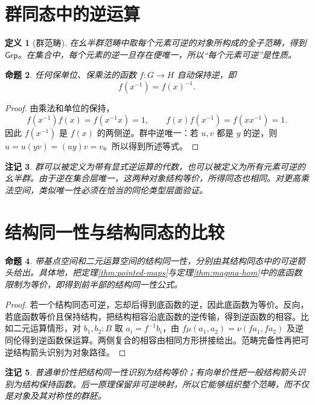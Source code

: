 \documentclass[12pt,oneside,openany,fontset=none]{ctexbook}
\theoremstyle{cn}
\newtheorem{definition}{定义}[chapter]
\newtheorem{proposition}[definition]{命题}
\newtheorem{remark}[definition]{注记}
\numberwithin{equation}{chapter}
\newcommand{\Grp}{\mathsf{Grp}}
\begin{document}
\section{群同态中的逆运算}
\begin{definition}[群范畴]
在幺半群范畴中取每个元素可逆的对象所构成的全子范畴，得到 $\Grp$。在集合中，每个元素的逆一旦存在便唯一，所以“每个元素可逆”是性质。
\end{definition}
\begin{proposition}
任何保单位、保乘法的函数 $f:G\to H$ 自动保持逆，即
\[
f(x^{-1})=f(x)^{-1}.
\]
\end{proposition}
\begin{proof}
由乘法和单位的保持，
\[
f(x^{-1})f(x)=f(x^{-1}x)=1,
\qquad
f(x)f(x^{-1})=f(xx^{-1})=1.
\]
因此 $f(x^{-1})$ 是 $f(x)$ 的两侧逆。群中逆唯一：若 $u,v$ 都是 $y$ 的逆，则 $u=u(yv)=(uy)v=v$。所以得到所述等式。
\end{proof}
\begin{remark}
群可以被定义为带有显式逆运算的代数，也可以被定义为所有元素可逆的幺半群。由于逆在集合层唯一，这两种对象结构等价，所得同态也相同。对更高乘法空间，类似唯一性必须在恰当的同伦类型层面验证。
\end{remark}

\section{结构同一性与结构同态的比较}
\begin{proposition}
带基点空间和二元运算空间的结构同一性，分别由其结构同态中的可逆箭头给出。具体地，把定理\ref{thm:pointed-maps}与定理\ref{thm:magma-hom}中的底函数限制为等价，即得到前半部的结构同一性公式。
\end{proposition}
\begin{proof}
若一个结构同态可逆，忘却后得到底函数的逆，因此底函数为等价。反向，若底函数等价且保持结构，把结构相容沿底函数的逆传输，得到逆函数的相容。比如二元运算情形，对 $b_1,b_2:B$ 取 $a_i=f^{-1}b_i$，由 $f\mu(a_1,a_2)=\nu(fa_1,fa_2)$ 及逆同伦得到逆函数保运算。两侧复合的相容由相同方形拼接给出。范畴完备性再把可逆结构箭头识别为对象路径。
\end{proof}
\begin{remark}
普通单价性把结构同一性识别为结构等价；有向单价性把一般结构箭头识别为结构保持函数。后一原理保留非可逆映射，所以它能够组织整个范畴，而不仅是对象及其对称性的群胚。
\end{remark}
\end{document}

